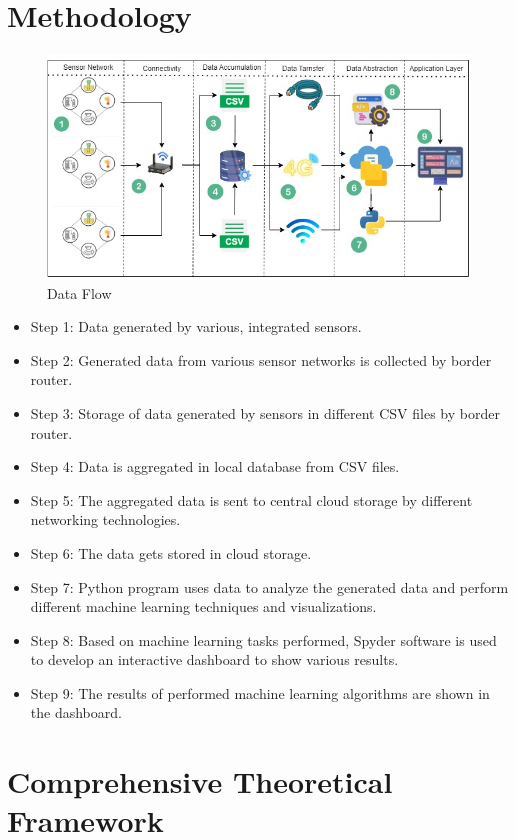 \documentclass{article}
\begin{document}
\section{Methodology}
\begin{figure}[h]
    \centering
    \includegraphics[width=1\linewidth]{dataflow1.jpg}
    \caption{Data Flow}
    \label{fig:enter-label}
\end{figure}

\begin{itemize}
    \item Step 1: Data generated by various, integrated sensors.
    \item Step 2: Generated data from various sensor networks is collected by border router.
    \item Step 3: Storage of data generated by sensors in different CSV files by border router.
    \item Step 4: Data is aggregated in local database from CSV files.
    \item Step 5: The aggregated data is sent to central cloud storage by different networking technologies.
    \item Step 6: The data gets stored in cloud storage.
    \item Step 7: Python program uses data to analyze the generated data and perform different machine learning techniques and visualizations.
    \item Step 8: Based on machine learning tasks performed, Spyder software is used to develop an interactive dashboard to show various results.
    \item Step 9: The results of performed machine learning algorithms are shown in the dashboard.
\end{itemize}

\section{Comprehensive Theoretical Framework}
\end{document}
